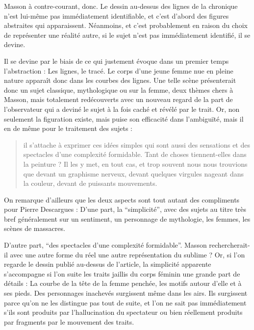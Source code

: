 	 Masson à contre-courant, donc. Le dessin au-dessus des lignes de la chronique n’est lui-même pas immédiatement identifiable, et c’est d’abord des figures abstraites qui apparaissent. Néanmoins, et c’est probablement en raison du choix de représenter une réalité autre, si le sujet n’est pas immédiatement identifié, il se devine. 

Il se devine par le biais de ce qui justement évoque dans un premier temps l’abstraction : Les lignes, le tracé. Le corps d’une jeune femme nue en pleine nature apparaît donc dans les courbes des lignes. Une telle scène présenterait donc un sujet classique, mythologique ou sur la femme, deux thèmes chers à Masson, mais totalement redécouverts avec un nouveau regard de la part de l’observateur qui a deviné le sujet à la fois caché et révélé par le trait. Or, non seulement la figuration existe, mais puise son efficacité dans l’ambiguïté, mais il en de même pour le traitement des sujets : 

\begin{quote}
il s’attache à exprimer ces idées simples qui sont aussi des sensations et des spectacles d’une complexité formidable. Tant de choses tiennent-elles dans la peinture ? Il les y met, en tout cas, et trop souvent nous nous trouvions que devant un graphisme nerveux, devant quelques virgules nageant dans la couleur, devant de puissants mouvements.  	
\end{quote}
 
	On remarque d’ailleurs que les deux aspects sont tout autant des compliments pour Pierre Descargues : D’une part, la \enquote{simplicité}, avec des sujets au titre très bref généralement sur un sentiment, un personnage de mythologie, les femmes, les scènes de massacres. 


	D’autre part, \enquote{des spectacles d’une complexité formidable}. Masson rechercherait-il avec une autre forme du réel une autre représentation du sublime ?  Or, si l’on regarde le dessin publié au-dessus de l’article, la simplicité apparente s’accompagne si l’on suite les traits jaillis du corps féminin une grande part de détails : La courbe de la tête de la femme penchée, les motifs autour d’elle et à ses pieds. Des personnages inachevés surgissent même dans les airs. Ils surgissent parce qu’on ne les distingue pas tout de suite, et l’on ne sait pas immédiatement s’ils sont produits par l’hallucination du spectateur ou bien réellement produits par fragments par le mouvement des traits. 

